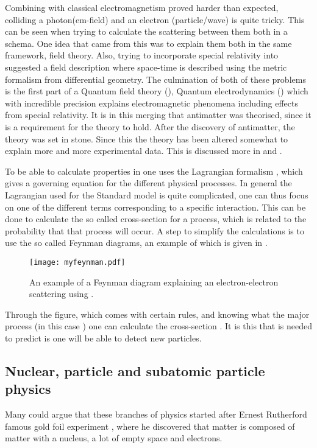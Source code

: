Combining \abbrQM with classical electromagnetism proved harder than expected, colliding a photon(em-field) and an electron (particle/wave) is quite tricky. This can be seen when trying to calculate the scattering between them both in a \abbrQM schema. One idea that came from this was to explain them both in the same framework, field theory. Also, trying to incorporate special relativity into \abbrQM suggested a field description where space-time is described using the metric formalism from differential geometry.
The culmination of both of these problems is the first part of a Quantum field theory (\abbrQFT), Quantum electrodynamics (\abbrQED) which with incredible precision explains electromagnetic phenomena including effects from special relativity\citep{Zee:2003}. It is in this merging that antimatter was theorised, since it is a requirement for the theory to hold. After the discovery of antimatter, the theory was set in stone. Since this the theory has been altered somewhat to explain more and more experimental data. This is discussed more in  and .

To be able to calculate properties in \abbrQFT one uses the Lagrangian formalism \citep{Goldstein:2001}, which gives a governing equation for the different physical processes. In general the Lagrangian used for the Standard model is quite complicated, one can thus focus on one of the different terms corresponding to a specific interaction. This can be done to calculate the so called cross-section for a process, which is related to the probability that that process will occur. A step to simplify the calculations is to use the so called Feynman diagrams, an example of which is given in . 

\begin{SCfigure}[][h]
 \centering
 \texttt{[image: myfeynman.pdf]}
  \caption{{\small An example of a Feynman diagram explaining an electron-electron scattering using \abbrQED.}}
    \label{fig:exFeynman}
\end{SCfigure}

Through the figure, which comes with certain rules, and knowing what the major process (in this case \abbrQED) one can calculate the cross-section \citep{Zee:2003}. It is this that is needed to predict is one will be able to detect new particles. 

\subsection{Nuclear, particle and subatomic particle physics}\label{sec:tb:subsec:nps}
Many could argue that these branches of physics started after Ernest Rutherford famous gold foil experiment \citep{Burchan:1995}, where he discovered that matter is composed of matter with a nucleus, a lot of empty space and electrons. 

